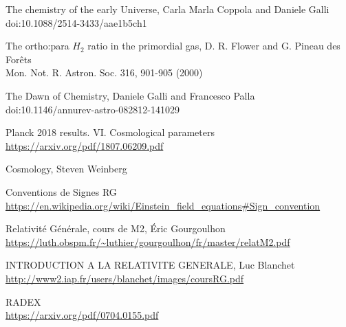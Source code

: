 \documentclass[10pt, a4paper]{report}
\numberwithin{equation}{subsection}
\begin{document}
\begin{thebibliography}{}

The chemistry of the early Universe, Carla Marla Coppola and Daniele Galli
\\doi:10.1088/2514-3433/aae1b5ch1

The ortho:para $H_2$ ratio in the primordial gas, D. R. Flower and G. Pineau des Forêts
\\Mon. Not. R. Astron. Soc. 316, 901-905 (2000)

The Dawn of Chemistry, Daniele Galli and Francesco Palla
\\doi:10.1146/annurev-astro-082812-141029

Planck 2018 results. VI. Cosmological parameters
\\\url{https://arxiv.org/pdf/1807.06209.pdf}

Cosmology, Steven Weinberg

Conventions de Signes RG
\\\url{https://en.wikipedia.org/wiki/Einstein_field_equations#Sign_convention}

Relativité Générale, cours de M2, Éric Gourgoulhon
\\\url{https://luth.obspm.fr/~luthier/gourgoulhon/fr/master/relatM2.pdf}

INTRODUCTION A LA RELATIVITE GENERALE, Luc Blanchet
\\\url{http://www2.iap.fr/users/blanchet/images/coursRG.pdf}

RADEX
\\\url{https://arxiv.org/pdf/0704.0155.pdf}



\end{thebibliography}
\end{document}
